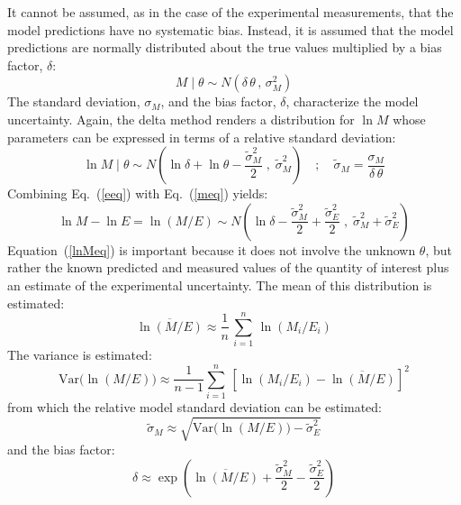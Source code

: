 \documentclass[fleqn,b5paper]{article}
\begin{document}
It cannot be assumed, as in the case of the experimental measurements, that the model predictions have no systematic bias. Instead, it is assumed that the model predictions are normally distributed about the true values multiplied by a bias factor, $\delta$:
\begin{equation}
   M \; | \; \theta \sim N \left(\delta \, \theta \, , \, \sigma_M^2 \right) \label{mdist}
\end{equation}
The standard deviation, $\sigma_M$, and the bias factor, $\delta$, characterize the model uncertainty. Again, the delta method renders a distribution for $\ln M$ whose parameters can be expressed in terms of a relative standard deviation:
\begin{equation}
   \ln M \; | \; \theta \sim N \left(\ln \delta +\ln \theta - \frac{\widetilde{\sigma}_M^2}{2} \; , \;
   \widetilde{\sigma}_M^2 \right) \quad ; \quad \widetilde{\sigma}_M=\frac{\sigma_M}{\delta \, \theta} \label{meq}
\end{equation}
Combining Eq.~(\ref{eeq}) with Eq.~(\ref{meq}) yields:
\begin{equation}
   \ln M  - \ln E = \ln(M/E) \sim N \left( \ln \delta - \frac{\widetilde{\sigma}_M^2}{2}+\frac{\widetilde{\sigma}_E^2}{2} \; ,
   \; \widetilde{\sigma}_M^2+\widetilde{\sigma}_E^2 \right) \label{lnMeq}
\end{equation}
Equation~(\ref{lnMeq}) is important because it does not involve the unknown $\theta$, but rather the known predicted and measured values of the quantity of interest plus an estimate of the experimental uncertainty. The mean of this distribution is estimated:
\begin{equation}
   \overline{\ln (M/E)} \approx \frac{1}{n} \, \sum_{i=1}^n \, \ln (M_i/E_i)
\end{equation}
The variance is estimated:
\begin{equation}
   \mathrm{Var} \Big( \ln (M/E) \Big) \approx \frac{1}{n-1} \sum_{i=1}^n \, \left[ \ln (M_i/E_i) - \overline{\ln (M/E)}  \right]^2 \label{stdev}
\end{equation}
from which the relative model standard deviation can be estimated:
\begin{equation}
   \widetilde{\sigma}_M \approx \sqrt{ \mathrm{Var}\Big( \ln (M/E) \Big) - \widetilde{\sigma}_E^2 } \label{sig_M}
\end{equation}
and the bias factor:
\begin{equation}
   \delta \approx \exp \left( \overline{\ln (M/E)} + \frac{ \widetilde{\sigma}_M^2}{2}-\frac{\widetilde{\sigma}_E^2}{2} \right) \label{delta}
\end{equation}
\end{document}
